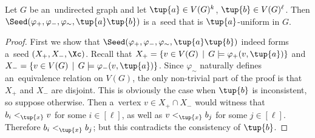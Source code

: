 \begin{lemma}\label{lem:def-to-seed}
    Let $G$ be an~undirected graph and let $\tup{a} \in V(G)^k$, $\tup{b} \in V(G)^\ell$.
    Then $\Seed(\varphi_+, \varphi_-, \varphi_\sim, \tup{a}\tup{b})$ is a~seed that is $\tup{a}$-uniform in $G$.
\end{lemma}
\begin{proof}
    First we show that $\Seed(\varphi_+, \varphi_-, \varphi_\sim, \tup{a}\tup{b})$ indeed forms a~seed $(X_+, X_-, \Xc)$.
    Recall that $X_+ = \{v \in V(G) \,\mid\, G \models \varphi_+(v, \tup{a})\}$ and $X_- = \{v \in V(G) \,\mid\, G \models \varphi_-(v, \tup{a})\}$.
    Since $\varphi_\sim$ naturally defines an~equivalence relation on $V(G)$, the only non-trivial part of the proof is that $X_+$ and $X_-$ are disjoint.
    This is obviously the case when $\tup{b}$ is inconsistent, so suppose otherwise.
    Then a~vertex $v \in X_+ \cap X_-$ would witness that $b_i <_{\tup{x}} v$ for some $i \in [\ell]$, as well as $v <_{\tup{x}} b_j$ for some $j \in [\ell]$.
    Therefore $b_i <_{\tup{x}} b_j$; but this contradicts the consistency of $\tup{b}$.


\end{proof}
